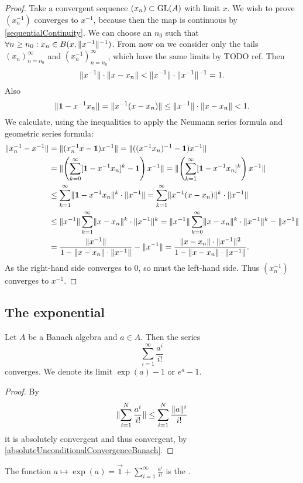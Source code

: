 \begin{proof}
Take a convergent sequence $(x_n)\subset\operatorname{GL}(A)$ with limit $x$. We wish to prove $(x_n^{-1})$ converges to $x^{-1}$, because then the map is continuous by \ref{sequentialContinuity}. We can choose an $n_0$ such that $\forall n\geq n_0: x_n \in B(x,\lVert x^{-1}\rVert^{-1})$. From now on we consider only the tails $(x_n)_{n=n_0}^\infty$ and $(x_n^{-1})_{n=n_0}^\infty$, which have the same limits by TODO ref. Then
\[ \lVert x^{-1}\rVert\cdot\lVert x-x_n\rVert < \lVert x^{-1}\rVert\cdot\lVert x^{-1}\rVert^{-1} = 1. \]
Also
\[ \lVert\boldsymbol{\mathrm{1}} - x^{-1}x_n\rVert = \lVert x^{-1}(x-x_n)\rVert \leq \lVert x^{-1}\rVert\cdot\lVert x-x_n\rVert < 1. \]
We calculate, using the inequalities to apply the Neumann series formula and geometric series formula:
\begin{align*}
\lVert x_n^{-1} - x^{-1}\rVert &= \lVert(x_n^{-1}x - \boldsymbol{\mathrm{1}})x^{-1}\rVert = \lVert((x^{-1}x_n)^{-1} - \boldsymbol{\mathrm{1}})x^{-1}\rVert \\
&= \lVert\left(\sum_{k=0}^\infty[\boldsymbol{\mathrm{1}} - x^{-1}x_n]^k - \boldsymbol{\mathrm{1}}\right)x^{-1}\rVert = \lVert\left(\sum_{k=1}^\infty[\boldsymbol{\mathrm{1}} - x^{-1}x_n]^k\right)x^{-1}\rVert \\
&\leq \sum_{k=1}^\infty\lVert\boldsymbol{\mathrm{1}} - x^{-1}x_n\rVert^k\cdot\lVert x^{-1}\rVert = \sum_{k=1}^\infty\lVert x^{-1}(x - x_n)\rVert^k\cdot\lVert x^{-1}\rVert \\
&\leq \lVert x^{-1}\rVert\sum_{k=1}^\infty\lVert x - x_n\rVert^k\cdot\lVert x^{-1}\rVert^{k} = \lVert x^{-1}\rVert\sum_{k=0}^\infty\lVert x - x_n\rVert^k\cdot\lVert x^{-1}\rVert^{k} - \lVert x^{-1}\rVert \\
&= \frac{\lVert x^{-1}\rVert}{1-\lVert x - x_n\rVert\cdot\lVert x^{-1}\rVert}-\lVert x^{-1}\rVert = \frac{\lVert x - x_n\rVert\cdot\lVert x^{-1}\rVert^2}{1-\lVert x - x_n\rVert\cdot\lVert x^{-1}\rVert}.
\end{align*}
As the right-hand side converges to $0$, so must the left-hand side. Thus $(x_n^{-1})$ converges to $x^{-1}$.
\end{proof}


\subsection{The exponential}
\begin{proposition}
Let $A$ be a Banach algebra and $a\in A$. Then the series
\[ \sum_{i=1}^\infty \frac{a^i}{i!} \]
converges. We denote its limit $\exp(a)-1$ or $e^a-1$.
\end{proposition}
\begin{proof}
By
\[ \lVert\sum_{i=1}^N \frac{a^i}{i!}\rVert \leq \sum_{i=1}^N \frac{\lVert a\rVert^i}{i!} \]
it is absolutely convergent and thus convergent, by \ref{absoluteUnconditionalConvergenceBanach}.
\end{proof}
The function $a\mapsto \exp(a) = \vec{1} + \sum_{i=1}^\infty \frac{a^i}{i!}$ is the .

